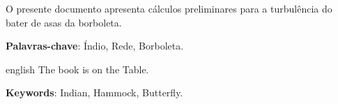 \documentclass[12pt,openright,oneside,a4paper,english,brazil,oficial]{iaeRT}
\begin{document}
\def\PalavrasChave{Índio, Rede, Borboleta}

\def\Keywords{Indian, Hammock, Butterfly}

\def\PalavrasChaveIndexacao{Índio, Rede, Borboleta}

\def\ArquivoEletronico{123-000000-X0010.pdf}

\def\CodSIGTEC{}

\def\Observacoes{}

\def\Resumo{O presente documento apresenta cálculos preliminares para a turbulência do bater de asas da borboleta.}

\def\Abstract{The book is on the Table.}

\def\Projeto{BRB01}
\def\InicioCodigo{123} 
\def\nivelSuperior{Não há}
\def\nivelInferior{Não há}



\frenchspacing 

\imprimircapa
\setcounter{page}{1}
\imprimirfolhaidentificacao

\setlength{\absparsep}{18pt} %
\begin{resumo}[Resumo]
 \Resumo

 \textbf{Palavras-chave}: \PalavrasChave.
\end{resumo}%
\begin{resumo}[Abstract]
 \begin{otherlanguage*}{english}
   \Abstract
 
   \noindent 
   \textbf{Keywords}: \Keywords.
 \end{otherlanguage*}
\end{resumo}\newpage
\listoffigures*
\cleardoublepage

\listoftables*
\cleardoublepage
\tableofcontents*
\cleardoublepage


\textual
\end{document}
